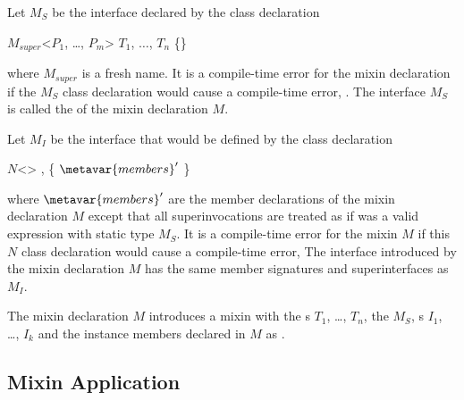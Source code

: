 \documentclass[makeidx]{article}
\begin{document}
\LMHash{}%
Let $M_S$ be the interface declared by the class declaration

\begin{normativeDartCode}
\ABSTRACT{} \CLASS{} $M_{super}$<$P_1$, \ldots, $P_m$> \IMPLEMENTS{} $T_1$, $\dots{}$, $T_n$ \{\}
\end{normativeDartCode}

\noindent
where $M_{super}$ is a fresh name.
It is a compile-time error for the mixin declaration if the $M_S$
class declaration would cause a compile-time error,
.
The interface $M_S$ is called the
 of the mixin declaration $M$.

\LMHash{}%
Let $M_I$ be the interface that would be defined by the class declaration

\begin{normativeDartCode}
\ABSTRACT{} \CLASS{} $N$<\TypeParametersStd>
    \IMPLEMENTS{} ,  \{
  $\metavar{members}'$
\}
\end{normativeDartCode}

\noindent
where $\metavar{members}'$ are the member declarations of
the mixin declaration $M$ except that all superinvocations are treated
as if \SUPER{} was a valid expression with static type $M_S$.
It is a compile-time error for the mixin $M$ if this $N$ class
declaration would cause a compile-time error,
The interface introduced by the mixin declaration $M$ has the same member
signatures and superinterfaces as $M_I$.

\LMHash{}%
The mixin declaration $M$ introduces a mixin
with the s $T_1$, \ldots, $T_n$,
the  $M_S$,
s $I_1$, \ldots, $I_k$
and the instance members declared in $M$ as .


\subsection{Mixin Application}
\end{document}

